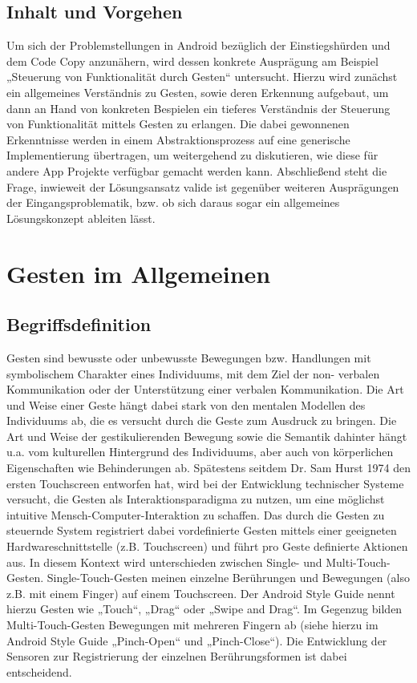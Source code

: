 \documentclass[12pt,oneside,a4paper,bibtotoc,liststotoc]{scrreprt}
\begin{document}
\section{Inhalt und Vorgehen}
Um sich der Problemstellungen in Android bezüglich der Einstiegshürden und dem Code Copy anzunähern, wird dessen konkrete Ausprägung am Beispiel „Steuerung von Funktionalität durch Gesten“ untersucht. Hierzu wird zunächst ein allgemeines Verständnis zu Gesten, sowie deren Erkennung aufgebaut, um dann an Hand von konkreten Bespielen ein tieferes Verständnis der Steuerung von Funktionalität mittels Gesten zu erlangen. Die dabei gewonnenen Erkenntnisse werden in einem Abstraktionsprozess auf eine generische Implementierung übertragen, um weitergehend zu diskutieren, wie diese für andere App Projekte verfügbar gemacht werden kann.\newline
Abschließend steht die Frage, inwieweit der Lösungsansatz valide ist gegenüber weiteren Ausprägungen der Eingangsproblematik, bzw. ob sich daraus sogar ein allgemeines Lösungskonzept ableiten lässt.

\chapter{Gesten im Allgemeinen}
\section{Begriffsdefinition}
Gesten sind bewusste oder unbewusste Bewegungen bzw. Handlungen mit symbolischem Charakter eines Individuums, mit dem Ziel der non- verbalen Kommunikation oder der Unterstützung einer verbalen Kommunikation. Die Art und Weise einer Geste hängt dabei stark von den mentalen Modellen des Individuums ab, die es versucht durch die Geste zum Ausdruck zu bringen. Die Art und Weise der gestikulierenden Bewegung sowie die Semantik dahinter hängt u.a. vom kulturellen Hintergrund des Individuums, aber auch von körperlichen Eigenschaften wie Behinderungen ab. \newline
Spätestens seitdem Dr. Sam Hurst 1974 den ersten Touchscreen entworfen hat, wird bei der Entwicklung technischer Systeme versucht, die Gesten als Interaktionsparadigma zu nutzen, um eine möglichst intuitive Mensch-Computer-Interaktion zu schaffen. Das durch die Gesten zu steuernde System registriert dabei vordefinierte Gesten mittels einer geeigneten Hardwareschnittstelle (z.B. Touchscreen) und führt pro Geste definierte Aktionen aus. In diesem Kontext wird unterschieden zwischen Single- und Multi-Touch-Gesten. Single-Touch-Gesten meinen einzelne Berührungen und Bewegungen (also z.B. mit einem Finger) auf einem Touchscreen. Der Android Style Guide nennt hierzu Gesten wie „Touch“, „Drag“ oder „Swipe and Drag“. Im Gegenzug bilden Multi-Touch-Gesten Bewegungen mit mehreren Fingern ab (siehe hierzu im Android Style Guide „Pinch-Open“ und „Pinch-Close“). Die Entwicklung der Sensoren zur Registrierung der einzelnen Berührungsformen ist dabei entscheidend.
\end{document}

